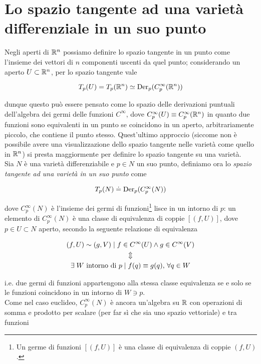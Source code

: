 \section{Lo spazio tangente ad una varietà differenziale in un suo punto}

Negli aperti di $ \mathbb{R}^{n} $ possiamo definire lo spazio tangente in un punto come l'insieme dei vettori di $ n $ componenti uscenti da quel punto; considerando un aperto $ U \subset \mathbb{R}^{n} $, per lo spazio tangente vale

\begin{equation}
	T_{p}(U) = T_{p}(\mathbb{R}^{n}) \simeq \operatorname{Der}_{p}(C_{p}^{\infty}(\mathbb{R}^{n}))
\end{equation}

dunque questo può essere pensato come lo spazio delle derivazioni puntuali dell'algebra dei germi delle funzioni $ C^{\infty} $, dove $ C_{p}^{\infty}(U) \equiv C_{p}^{\infty}(\mathbb{R}^{n}) $ in quanto due funzioni sono equivalenti in un punto se coincidono in un aperto, arbitrariamente piccolo, che contiene il punto stesso. Quest'ultimo approccio (siccome non è possibile avere una visualizzazione dello spazio tangente nelle varietà come quello in $ \mathbb{R}^{n} $) si presta maggiormente per definire lo spazio tangente su una varietà.\\
Sia $ N $ è una varietà differenziabile e $ p \in N $ un suo punto, definiamo ora lo \textit{spazio tangente ad una varietà in un suo punto} come

\begin{equation}
	T_{p}(N) \doteq \operatorname{Der}_{p}(C_{p}^{\infty}(N))
\end{equation}

dove $ C_{p}^{\infty}(N) $ è l'insieme dei germi di funzioni\footnote{%
	Un germe di funzioni $ [(f,U)] $ è una classe di equivalenza di coppie $ (f,U) $.%
} lisce in un intorno di $ p $: un elemento di $ C_{p}^{\infty}(N) $ è una classe di equivalenza di coppie $ [(f,U)] $, dove $ p \in U \subset N $ aperto, secondo la seguente relazione di equivalenza

\begin{gather}
	(f,U) \sim (g,V) \mid f \in C^{\infty}(U) \wedge g \in C^{\infty}(V)\nonumber\\
	\Updownarrow\\
	\exists \; W \text{ intorno di } p \mid f(q) \equiv g(q) , \, \forall q \in W\nonumber
\end{gather}

i.e. due germi di funzioni appartengono alla stessa classe equivalenza se e solo se le funzioni coincidono in un intorno di $ W \ni p $.\\
Come nel caso euclideo, $ C_{p}^{\infty}(N) $ è ancora un'algebra su $ \mathbb{R} $ con operazioni di somma e prodotto per scalare (per far sì che sia uno spazio vettoriale) e tra funzioni

